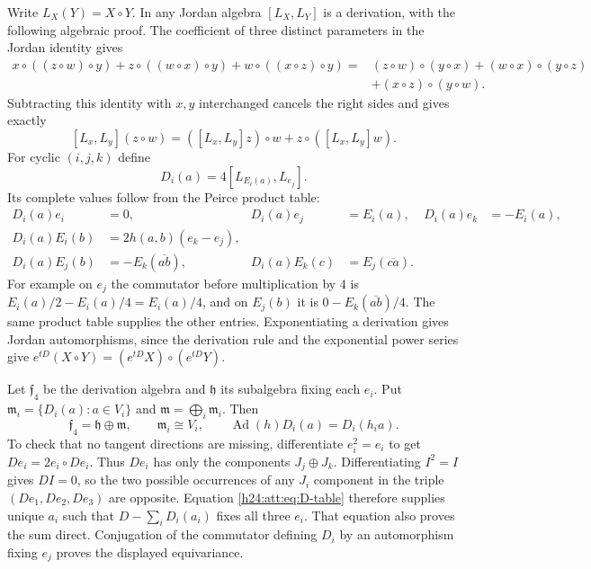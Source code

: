 Write $L_X(Y)=X\circ Y$. In any Jordan algebra $[L_X,L_Y]$ is a
derivation, with the following algebraic proof. The coefficient of
three distinct parameters in the Jordan identity gives
\begin{align*}
x\circ((z\circ w)\circ y)+z\circ((w\circ x)\circ y)
 +w\circ((x\circ z)\circ y)
={}&(z\circ w)\circ(y\circ x)+(w\circ x)\circ(y\circ z)\\
&+(x\circ z)\circ(y\circ w).
\end{align*}
Subtracting this identity with $x,y$ interchanged cancels the right
sides and gives exactly
\[
 [L_x,L_y](z\circ w)
 =([L_x,L_y]z)\circ w+z\circ([L_x,L_y]w).
\]
For cyclic $(i,j,k)$ define
\begin{equation}
 D_i(a)=4[L_{E_i(a)},L_{e_j}].
 \label{h24:att:eq:derivations}
\end{equation}
Its complete values follow from the Peirce product table:
\begin{align}
 D_i(a)e_i&=0,& D_i(a)e_j&=E_i(a),&
 D_i(a)e_k&=-E_i(a),\nonumber\\
 D_i(a)E_i(b)&=2h(a,b)(e_k-e_j),\label{h24:att:eq:D-table}\\
 D_i(a)E_j(b)&=-E_k(\overline{ab}),&
 D_i(a)E_k(c)&=E_j(\overline{ca}).\nonumber
\end{align}
For example on $e_j$ the commutator before multiplication by $4$ is
$E_i(a)/2-E_i(a)/4=E_i(a)/4$, and on $E_j(b)$ it is
$0-E_k(\overline{ab})/4$. The same product table supplies the other
entries. Exponentiating a derivation gives Jordan automorphisms,
since the derivation rule and the exponential power series give
$e^{tD}(X\circ Y)=(e^{tD}X)\circ(e^{tD}Y)$.

Let $\mathfrak f_4$ be the derivation algebra and $\mathfrak h$
its subalgebra fixing each $e_i$. Put
$\mathfrak m_i=\{D_i(a):a\in V_i\}$ and
$\mathfrak m=\bigoplus_i\mathfrak m_i$. Then
\begin{equation}
 \mathfrak f_4=\mathfrak h\oplus\mathfrak m,\qquad
 \mathfrak m_i\cong V_i,\qquad
 \operatorname{Ad}(h)D_i(a)=D_i(h_i a).
 \label{h24:att:eq:reductive}
\end{equation}
To check that no tangent directions are missing, differentiate
$e_i^2=e_i$ to get $De_i=2e_i\circ De_i$. Thus $De_i$ has only the
components $J_j\oplus J_k$. Differentiating $I^2=I$ gives $DI=0$,
so the two possible occurrences of any $J_i$ component in the triple
$(De_1,De_2,De_3)$ are opposite. Equation \eqref{h24:att:eq:D-table}
therefore supplies unique $a_i$ such that $D-\sum_iD_i(a_i)$ fixes
all three $e_i$. That equation also proves the sum direct.
Conjugation of the commutator defining $D_i$ by an automorphism
fixing $e_j$ proves the displayed equivariance.

